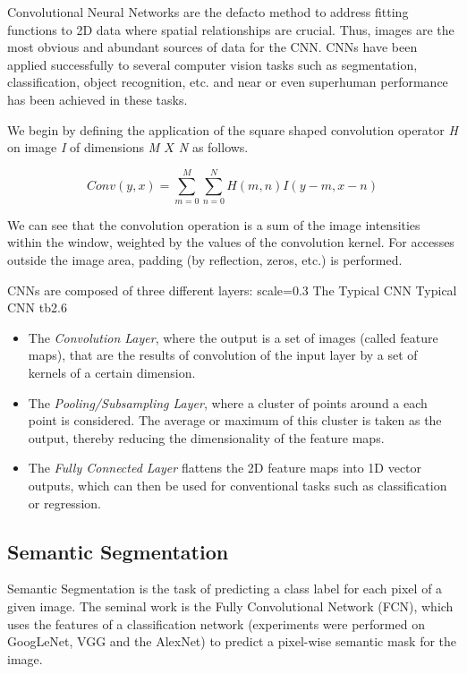 Convolutional Neural Networks are the defacto method to address fitting functions to 2D data where spatial relationships are crucial. Thus, images are the most obvious and abundant sources of data for the CNN. CNNs have been applied successfully to several computer vision tasks such as segmentation, classification, object recognition, etc. and near or even superhuman performance has been achieved in these tasks.

We begin by defining the application of the square shaped convolution operator \emph{H} on image \emph{I} of dimensions \emph{M $X$ N} as follows.

\[Conv(y, x) = \sum_{m=0}^{M}\sum_{n=0}^{N}H(m, n)I(y-m, x-n)\]

We can see that the convolution operation is a sum of the image intensities within the window, weighted by the values of the convolution kernel. For accesses outside the image area, padding (by reflection, zeros, etc.) is performed.

CNNs are composed of three different layers: 
{scale=0.3}%
{The Typical CNN}%
{Typical CNN}%
{tb2.6} %
\begin{itemize}
	\item The \textit{Convolution Layer}, where the output is a set of images (called feature maps), that are the results of convolution of the input layer by a set of kernels of a certain dimension. \\
	\item The \textit{Pooling/Subsampling Layer}, where a cluster of points around a each point is considered. The average or maximum of this cluster is taken as the output, thereby reducing the dimensionality of the feature maps. \\ 
	\item The \textit{Fully Connected Layer} flattens the 2D feature maps into 1D vector outputs, which can then be used for conventional tasks such as classification or regression. 
\end{itemize}

\subsection{Semantic Segmentation}
Semantic Segmentation is the task of predicting a class label for each pixel of a given image. 
The seminal work is the Fully Convolutional Network (FCN), which uses the features of a classification network (experiments were performed on GoogLeNet, VGG and the AlexNet) to predict a pixel-wise semantic mask for the image. 

